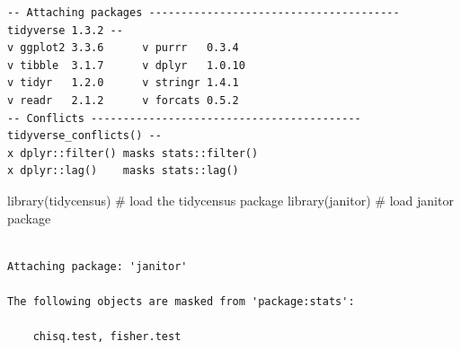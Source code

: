 \documentclass[
  letterpaper,
  DIV=11,
  numbers=noendperiod]{scrreprt}
\newenvironment{Shaded}{\begin{snugshade}}{\end{snugshade}}
\newcommand{\CommentTok}[1]{\textcolor[rgb]{0.37,0.37,0.37}{#1}}
\newcommand{\FunctionTok}[1]{\textcolor[rgb]{0.28,0.35,0.67}{#1}}
\newcommand{\NormalTok}[1]{\textcolor[rgb]{0.00,0.23,0.31}{#1}}
\begin{document}
\begin{verbatim}
-- Attaching packages --------------------------------------- tidyverse 1.3.2 --
v ggplot2 3.3.6      v purrr   0.3.4 
v tibble  3.1.7      v dplyr   1.0.10
v tidyr   1.2.0      v stringr 1.4.1 
v readr   2.1.2      v forcats 0.5.2 
-- Conflicts ------------------------------------------ tidyverse_conflicts() --
x dplyr::filter() masks stats::filter()
x dplyr::lag()    masks stats::lag()
\end{verbatim}

\begin{Shaded}
\begin{Highlighting}[]
\FunctionTok{library}\NormalTok{(tidycensus) }\CommentTok{\# load the tidycensus package}
\FunctionTok{library}\NormalTok{(janitor) }\CommentTok{\# load janitor package}
\end{Highlighting}
\end{Shaded}

\begin{verbatim}

Attaching package: 'janitor'

The following objects are masked from 'package:stats':

    chisq.test, fisher.test
\end{verbatim}
\end{document}
